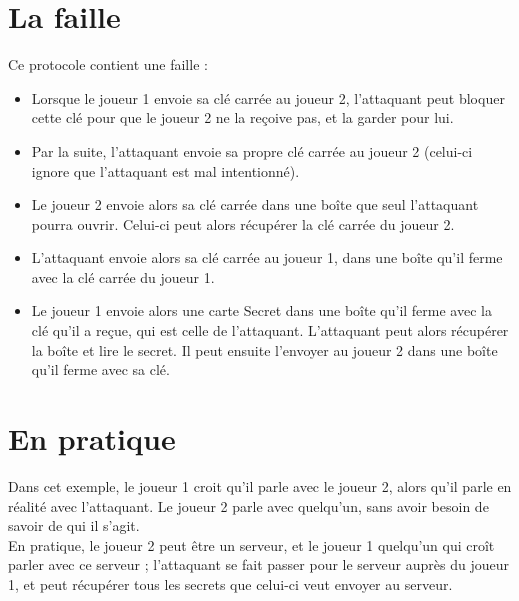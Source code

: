 \documentclass[a4paper,10pt]{article}
\begin{document}
\section{La faille}
Ce protocole contient une faille :
\begin{itemize}
 \item Lorsque le joueur 1 envoie sa clé carrée au joueur 2, l'attaquant peut bloquer cette clé pour que le joueur 2 ne la reçoive pas, et la garder pour lui.
 \item Par la suite, l'attaquant envoie sa propre clé carrée au joueur 2 (celui-ci ignore que l'attaquant est mal intentionné).
 \item Le joueur 2 envoie alors sa clé carrée dans une boîte que seul l'attaquant pourra ouvrir. Celui-ci peut alors récupérer la clé carrée du joueur 2.
 \item L'attaquant envoie alors sa clé carrée au joueur 1, dans une boîte qu'il ferme avec la clé carrée du joueur 1.
 \item Le joueur 1 envoie alors une carte Secret dans une boîte qu'il ferme avec la clé qu'il a reçue, qui est celle de l'attaquant. L'attaquant peut alors récupérer la boîte et lire le secret. Il peut ensuite l'envoyer au joueur 2 dans une boîte qu'il ferme avec sa clé.
\end{itemize}

\section{En pratique}
Dans cet exemple, le joueur 1 croit qu'il parle avec le joueur 2, alors qu'il parle en réalité avec l'attaquant. Le joueur 2 parle avec quelqu'un, sans avoir besoin de savoir de qui il s'agit.\\
En pratique, le joueur 2 peut être un serveur, et le joueur 1 quelqu'un qui croît parler avec ce serveur ; l'attaquant se fait passer pour le serveur auprès du joueur 1, et peut récupérer tous les secrets que celui-ci veut envoyer au serveur.
\end{document}
